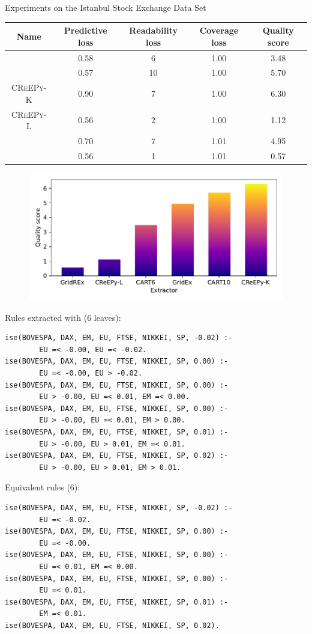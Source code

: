 \documentclass{beamer}
\newcommand{\creepy}{\textsc{CReEPy}}
\begin{document}
\begin{frame}{Experiments on the Istanbul Stock Exchange Data Set}
	\framebreak
	
	\begin{table}[]\centering
		\scriptsize
		\begin{tabular}{ccccc}
			\toprule
			Name & Predictive loss & Readability loss & Coverage loss & Quality score \\
			\midrule
			\cart6 & 0.58 & 6 & 1.00 & 3.48 \\
			\cart10 & 0.57 & 10 & 1.00 & 5.70 \\
			\creepy-K & 0.90 & 7 & 1.00 & 6.30 \\
			\creepy-L & 0.56 & 2 & 1.00 & 1.12 \\
			\gridex{} & 0.70 & 7 & 1.01 & 4.95 \\
			\gridrex{} & 0.56 & 1 & 1.01 & 0.57 \\
			\bottomrule
		\end{tabular}
	\end{table}
	
	\begin{figure}[]\centering
		\includegraphics[width=.675\linewidth]{figures/bcr.pdf}
	\end{figure}

	\framebreak
	
	Rules extracted with \cart{} (6 leaves):
	\begin{lstlisting}
ise(BOVESPA, DAX, EM, EU, FTSE, NIKKEI, SP, -0.02) :-
		EU =< -0.00, EU =< -0.02.
ise(BOVESPA, DAX, EM, EU, FTSE, NIKKEI, SP, 0.00) :-
		EU =< -0.00, EU > -0.02.
ise(BOVESPA, DAX, EM, EU, FTSE, NIKKEI, SP, 0.00) :-
		EU > -0.00, EU =< 0.01, EM =< 0.00.
ise(BOVESPA, DAX, EM, EU, FTSE, NIKKEI, SP, 0.00) :-
		EU > -0.00, EU =< 0.01, EM > 0.00.
ise(BOVESPA, DAX, EM, EU, FTSE, NIKKEI, SP, 0.01) :-
		EU > -0.00, EU > 0.01, EM =< 0.01.
ise(BOVESPA, DAX, EM, EU, FTSE, NIKKEI, SP, 0.02) :-
		EU > -0.00, EU > 0.01, EM > 0.01.
	\end{lstlisting}

	\framebreak
	
	Equivalent rules (\cart{}6):
	\begin{lstlisting}
ise(BOVESPA, DAX, EM, EU, FTSE, NIKKEI, SP, -0.02) :-
		EU =< -0.02.
ise(BOVESPA, DAX, EM, EU, FTSE, NIKKEI, SP, 0.00) :-
		EU =< -0.00.
ise(BOVESPA, DAX, EM, EU, FTSE, NIKKEI, SP, 0.00) :-
		EU =< 0.01, EM =< 0.00.
ise(BOVESPA, DAX, EM, EU, FTSE, NIKKEI, SP, 0.00) :-
		EU =< 0.01.
ise(BOVESPA, DAX, EM, EU, FTSE, NIKKEI, SP, 0.01) :-
		EM =< 0.01.
ise(BOVESPA, DAX, EM, EU, FTSE, NIKKEI, SP, 0.02).
	\end{lstlisting}


\end{frame}
\end{document}
